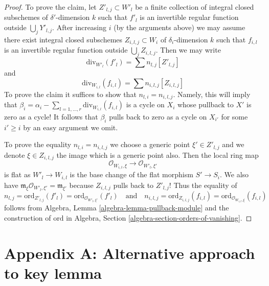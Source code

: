 \begin{proof}
\medskip\noindent
To prove the claim, let $Z'_{l, j} \subset W'_l$ be a finite
collection of integral closed subschemes of $\delta'$-dimension $k$
such that $f'_l$ is an invertible regular function outside
$\bigcup_j Y'_{l, j}$. After increasing $i$ (by the arguments above)
we may assume there exist integral closed subschemes $Z_{i, l, j} \subset W_i$
of $\delta_i$-dimension $k$ such that $f_{i, l}$ is an
invertible regular function outside $\bigcup_j Z_{i, l, j}$.
Then we may write
$$
\text{div}_{W'_l}(f'_l) = \sum n_{l, j} [Z'_{l, j}]
$$
and
$$
\text{div}_{W_{i, l}}(f_{i, l}) = \sum n_{i, l, j} [Z_{i, l, j}]
$$
To prove the claim it suffices to show that $n_{l, i} = n_{i, l, j}$.
Namely, this will imply that $\beta_i =
\alpha_i - \sum\nolimits_{l = 1, \ldots, r} \text{div}_{W_{i, l}}(f_{i, l})$
is a cycle on $X_i$ whose pullback to $X'$ is zero as a cycle!
It follows that $\beta_i$ pulls back to zero as a cycle on $X_{i'}$
for some $i' \geq i$ by an easy argument we omit.

\medskip\noindent
To prove the equality $n_{l, i} = n_{i, l, j}$ we choose a
generic point $\xi' \in Z'_{l, j}$ and we denote
$\xi \in Z_{i, l, j}$ the image which is a generic point also.
Then the local ring map
$$
\mathcal{O}_{W_{i, l}, \xi}
\longrightarrow
\mathcal{O}_{W'_l, \xi'}
$$
is flat as $W'_l \to W_{i, l}$ is the base change of the flat
morphism $S' \to S_i$. We also have
$\mathfrak m_\xi \mathcal{O}_{W'_l, \xi'} = \mathfrak m_{\xi'}$
because $Z_{i, l, j}$ pulls back to $Z'_{l, j}$! Thus the equality of
$$
n_{l, j} = \text{ord}_{Z'_{l, j}}(f'_l) =
\text{ord}_{\mathcal{O}_{W'_l, \xi'}}(f'_l)
\quad\text{and}\quad
n_{i, l, j} = \text{ord}_{Z_{i, l, j}}(f_{i, l}) =
\text{ord}_{\mathcal{O}_{W_{i, l}, \xi}}(f_{i, l})
$$
follows from Algebra, Lemma \ref{algebra-lemma-pullback-module}
and the construction of $\text{ord}$ in
Algebra, Section \ref{algebra-section-orders-of-vanishing}.
\end{proof}












\section{Appendix A: Alternative approach to key lemma}
\label{section-appendix-A}

